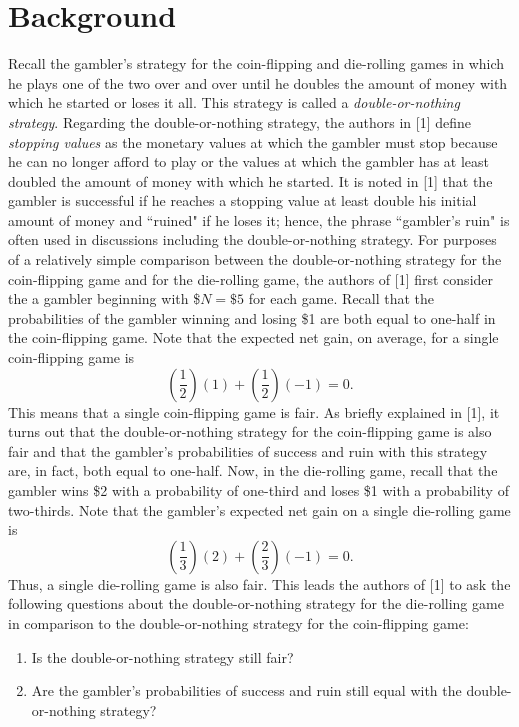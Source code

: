 \documentclass[12pt]{article}
\begin{document}
\section{Background}
Recall the gambler's strategy for the coin-flipping and die-rolling games in which he plays one of the two over and over until he doubles the amount of money with which he started or loses it all.  
This strategy is called a \textit{double-or-nothing strategy}.  
Regarding the double-or-nothing strategy, the authors in [1] define \textit{stopping values} as the monetary values at which the gambler must stop because he can no longer afford to play or the values at which the gambler has at least doubled the amount of money with which he started.  
It is noted in [1] that the gambler is successful if he reaches a stopping value at least double his initial amount of money and ``ruined" if he loses it; hence, the phrase ``gambler's ruin" is often used in discussions including the double-or-nothing strategy.  
\newline For purposes of a relatively simple comparison between the double-or-nothing strategy for the coin-flipping game and for the die-rolling game, the authors of [1] first consider the a gambler beginning with \$$N = \$5$ for each game.
Recall that the probabilities of the gambler winning and losing \$1 are both equal to one-half in the coin-flipping game.  
Note that the expected net gain, on average, for a single coin-flipping game is 
$$\left( \frac{1}{2} \right)(1) + \left( \frac{1}{2} \right)(-1) = 0.$$
This means that a single coin-flipping game is fair.  
As briefly explained in [1], it turns out that the double-or-nothing strategy for the coin-flipping game is also fair and that the gambler's probabilities of success and ruin with this strategy are, in fact, both equal to one-half.
\newline Now, in the die-rolling game, recall that the gambler wins \$2 with a probability of one-third and loses \$1 with a probability of two-thirds.
Note that the gambler's expected net gain on a single die-rolling game is 
$$ \left( \frac{1}{3} \right)(2) + \left( \frac{2}{3} \right)(-1) = 0. $$
Thus, a single die-rolling game is also fair.
This leads the authors of [1] to ask the following questions about the double-or-nothing strategy for the die-rolling game in comparison to the double-or-nothing strategy for the coin-flipping game:
\begin{enumerate}
    \item Is the double-or-nothing strategy still fair?
    \item Are the gambler's probabilities of success and ruin still equal with the double-or-nothing strategy?
\end{enumerate}
\end{document}
